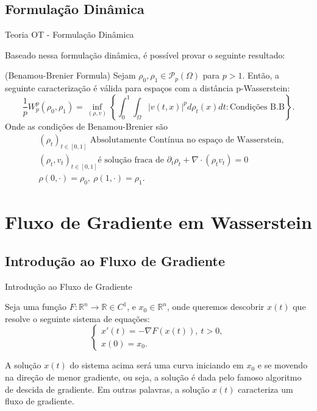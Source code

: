 \documentclass[10pt]{beamer}
\begin{document}
\subsection{Formulação Dinâmica}
\begin{frame}[fragile]{Teoria OT - Formulação Dinâmica}

	Baseado nessa formulação dinâmica, é possível provar o
	seguinte resultado:

	\begin{theorem}{(Benamou-Brenier Formula)}
	\label{theorem.Benamou-Brenier}
	Sejam $\rho_0, \rho_1 \in \mathcal P_p(\Omega)$ para $p>1$.
	Então, a seguinte caracterização é válida para espaços com a distância p-Wasserstein:
	\begin{equation*}
	\frac{1}{p}W^p_p(\rho_0, \rho_1) 
	= 
	\inf_{(\rho, v)}
	\left\{
	\int_0^1\int_{\Omega}\left|v(t,x)\right|^p d \rho_t(x)d t: \text{Condições B.B}
	\right\}.
	\end{equation*}
	Onde as condições de Benamou-Brenier são
	\begin{align*}
	&(\rho_t)_{t \in [0,1]} \text{ Absolutamente Contínua no espaço de Wasserstein}, \\
	&(\rho_t, v_t)_{t \in [0,1]} \text{é solução fraca de }
	\partial_t \rho_t + \nabla\cdot\left(\rho_t v_t\right) = 0
	\\
	&\rho(0,\cdot) = \rho_0, \ \rho(1, \cdot) = \rho_1 .
	\end{align*}
\end{theorem} 
\end{frame}

\AtBeginSection{}
\section[Fluxo de Gradiente em Wasserstein]{Fluxo de Gradiente em Wasserstein}
\subsection{Introdução ao Fluxo de Gradiente}
\begin{frame}[fragile]{Introdução ao Fluxo de Gradiente}

	Seja uma função $F:\mathbb R^n \to \mathbb R \in C^1$, e $x_0 \in \mathbb R^n$,
	onde queremos descobrir $x(t)$ que resolve o seguinte sistema de equações:
	\begin{equation}
		\begin{cases}
			x'(t) = -\nabla F(x(t)), \ t>0,\\
			x(0)  = x_0.
		\end{cases}
		\label{eq:fluxograd}
	\end{equation}

	A solução $x(t)$ do sistema acima será uma curva iniciando em $x_0$ e se movendo
	na direção de menor gradiente, ou seja, a solução é dada
	pelo famoso algoritmo de descida de gradiente. Em outras palavras,
	a solução $x(t)$ caracteriza um fluxo de gradiente.

\end{frame}
\end{document}
